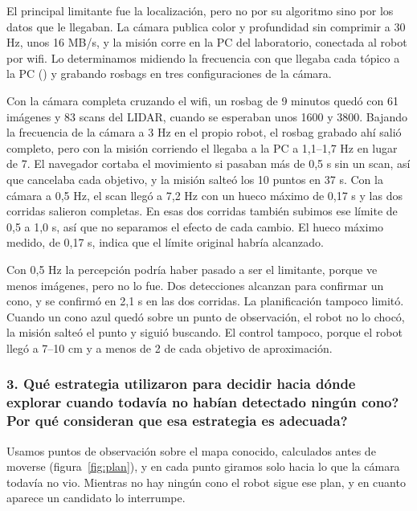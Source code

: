 El principal limitante fue la localización, pero no por su algoritmo sino por
los datos que le llegaban. La cámara publica color y profundidad sin
comprimir a 30 Hz, unos 16 MB/s, y la misión corre en la PC del laboratorio,
conectada al robot por wifi. Lo determinamos midiendo la frecuencia con que
llegaba cada tópico a la PC () y grabando rosbags en
tres configuraciones de la cámara.

Con la cámara completa cruzando el wifi, un rosbag de 9 minutos quedó
con 61 imágenes y 83 scans del LIDAR, cuando se esperaban unos 1600 y
3800. Bajando la frecuencia de la cámara a 3 Hz en el propio robot, el
rosbag grabado ahí salió completo, pero con la misión corriendo el
 llegaba a la PC a 1,1--1,7 Hz en lugar de 7. El navegador
cortaba el movimiento si pasaban más de 0,5 s sin un scan, así que cancelaba
cada objetivo, y la misión salteó los 10 puntos en 37 s. Con la cámara a
0,5 Hz, el scan llegó a 7,2 Hz con un hueco máximo de 0,17 s y las dos
corridas salieron completas. En esas dos corridas también subimos ese límite
de 0,5 a 1,0 s, así que no separamos el efecto de cada cambio. El hueco
máximo medido, de 0,17 s, indica que el límite original habría alcanzado.

Con 0,5 Hz la percepción podría haber pasado a ser el limitante, porque ve
menos imágenes, pero no lo fue. Dos detecciones alcanzan para confirmar un
cono, y se confirmó en 2,1 s en las dos corridas. La planificación tampoco
limitó. Cuando un cono azul
quedó sobre un punto de observación, el robot no lo chocó, la misión salteó
el punto y siguió buscando. El control tampoco, porque el robot llegó a 7--10 cm y a menos de 2\textdegree{} de cada objetivo
de aproximación.

\subsubsection*{3. \textquestiondown{}Qué estrategia utilizaron para decidir hacia dónde explorar cuando todavía no habían detectado ningún cono? \textquestiondown{}Por qué consideran que esa estrategia es adecuada?}

Usamos puntos de observación sobre el mapa conocido, calculados antes de
moverse (figura~\ref{fig:plan}), y en cada punto giramos solo hacia lo que la
cámara todavía no vio. Mientras no hay ningún cono el robot sigue ese plan, y en
cuanto aparece un candidato lo interrumpe.

